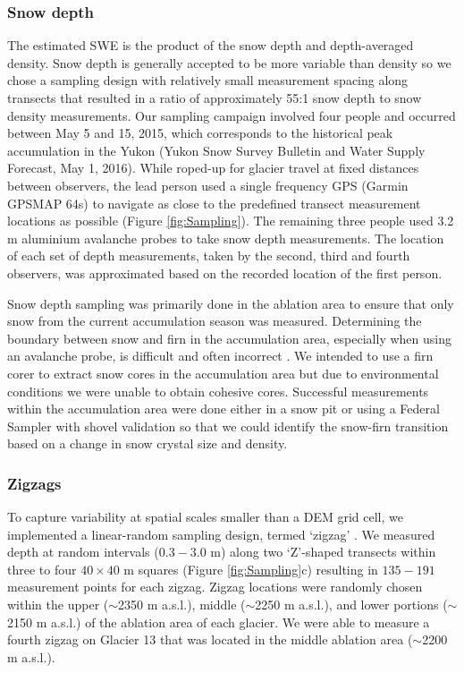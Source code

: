 \documentclass[twocolumn, letterpaper]{igs}
\begin{document}
\subsubsection{Snow depth}

The estimated SWE is the product of the snow depth and depth-averaged density. Snow depth is generally accepted to be more variable than density \citep{Elder1991, Clark2011, Lopez2013} so we chose a sampling design with relatively small measurement spacing along transects that resulted in a ratio of approximately 55:1 snow depth to snow density measurements. Our sampling campaign involved four people and occurred between May 5 and 15, 2015, which corresponds to the historical peak accumulation in the Yukon (Yukon Snow Survey Bulletin and Water Supply Forecast, May 1, 2016). While roped-up for glacier travel at fixed distances between observers, the lead person used a single frequency GPS (Garmin GPSMAP 64s) to navigate as close to the predefined transect measurement locations as possible (Figure \ref{fig:Sampling}). The remaining three people used 3.2 m aluminium avalanche probes to take snow depth measurements. The location of each set of depth measurements, taken by the second, third and fourth observers, was approximated based on the recorded location of the first person. 

Snow depth sampling was primarily done in the ablation area to ensure that only snow from the current accumulation season was measured. Determining the boundary between snow and firn in the accumulation area, especially when using an avalanche probe, is difficult and often incorrect \citep{Grunewald2010,Sold2013}. We intended to use a firn corer to extract snow cores in the accumulation area but due to environmental conditions we were unable to obtain cohesive cores. Successful measurements within the accumulation area were done either in a snow pit or using a Federal Sampler with shovel validation so that we could identify the snow-firn transition based on a change in snow crystal size and density. 

\subsubsection{Zigzags}

To capture variability at spatial scales smaller than a DEM grid cell, we implemented a linear-random sampling design, termed `zigzag' \citep{Shea2010}. We measured depth at random intervals ($0.3 - 3.0$ m) along two `Z'-shaped transects within three to four $40\times40$ m squares (Figure \ref{fig:Sampling}c) resulting in $135-191$ measurement points for each zigzag. Zigzag locations were randomly chosen within the upper ($\sim$2350 m a.s.l.), middle ($\sim$2250 m a.s.l.), and lower portions ($\sim$2150 m a.s.l.) of the ablation area of each glacier. We were able to measure a fourth zigzag on Glacier 13 that was located in the middle ablation area ($\sim$2200 m a.s.l.).
\end{document}
